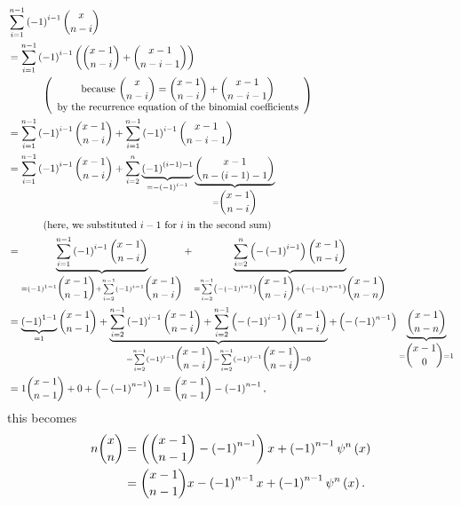 \documentclass[numbers=enddot,12pt,final,onecolumn,notitlepage]{scrartcl}%
\begin{document}
\begin{align*}
&  \sum_{i=1}^{n-1}\left(  -1\right)  ^{i-1}\dbinom{x}{n-i}\\
&  =\sum_{i=1}^{n-1}\left(  -1\right)  ^{i-1}\left(  \dbinom{x-1}{n-i}%
+\dbinom{x-1}{n-i-1}\right) \\
&  \ \ \ \ \ \ \ \ \ \ \left(
\begin{array}
[c]{c}%
\text{because }\dbinom{x}{n-i}=\dbinom{x-1}{n-i}+\dbinom{x-1}{n-i-1}\\
\text{by the recurrence equation of the binomial coefficients}%
\end{array}
\right) \\
&  =\sum_{i=1}^{n-1}\left(  -1\right)  ^{i-1}\dbinom{x-1}{n-i}+\sum
_{i=1}^{n-1}\left(  -1\right)  ^{i-1}\dbinom{x-1}{n-i-1}\\
&  =\sum_{i=1}^{n-1}\left(  -1\right)  ^{i-1}\dbinom{x-1}{n-i}+\sum_{i=2}%
^{n}\underbrace{\left(  -1\right)  ^{\left(  i-1\right)  -1}}_{=-\left(
-1\right)  ^{i-1}}\underbrace{\dbinom{x-1}{n-\left(  i-1\right)  -1}%
}_{=\dbinom{x-1}{n-i}}\\
&  \ \ \ \ \ \ \ \ \ \ \left(  \text{here, we substituted }i-1\text{ for
}i\text{ in the second sum}\right) \\
&  =\underbrace{\sum_{i=1}^{n-1}\left(  -1\right)  ^{i-1}\dbinom{x-1}{n-i}%
}_{=\left(  -1\right)  ^{1-1}\dbinom{x-1}{n-1}+\sum\limits_{i=2}^{n-1}\left(
-1\right)  ^{i-1}\dbinom{x-1}{n-i}}+\underbrace{\sum_{i=2}^{n}\left(  -\left(
-1\right)  ^{i-1}\right)  \dbinom{x-1}{n-i}}_{=\sum\limits_{i=2}^{n-1}\left(
-\left(  -1\right)  ^{i-1}\right)  \dbinom{x-1}{n-i}+\left(  -\left(
-1\right)  ^{n-1}\right)  \dbinom{x-1}{n-n}}\\
&  =\underbrace{\left(  -1\right)  ^{1-1}}_{=1}\dbinom{x-1}{n-1}%
+\underbrace{\sum\limits_{i=2}^{n-1}\left(  -1\right)  ^{i-1}\dbinom{x-1}%
{n-i}+\sum\limits_{i=2}^{n-1}\left(  -\left(  -1\right)  ^{i-1}\right)
\dbinom{x-1}{n-i}}_{=\sum\limits_{i=2}^{n-1}\left(  -1\right)  ^{i-1}%
\dbinom{x-1}{n-i}-\sum\limits_{i=2}^{n-1}\left(  -1\right)  ^{i-1}\dbinom
{x-1}{n-i}=0}+\left(  -\left(  -1\right)  ^{n-1}\right)  \underbrace{\dbinom
{x-1}{n-n}}_{=\dbinom{x-1}{0}=1}\\
&  =1\dbinom{x-1}{n-1}+0+\left(  -\left(  -1\right)  ^{n-1}\right)
1=\dbinom{x-1}{n-1}-\left(  -1\right)  ^{n-1},
\end{align*}
this becomes%
\begin{align*}
n\dbinom{x}{n}  &  =\left(  \dbinom{x-1}{n-1}-\left(  -1\right)
^{n-1}\right)  x+\left(  -1\right)  ^{n-1}\psi^{n}\left(  x\right) \\
&  =\dbinom{x-1}{n-1}x-\left(  -1\right)  ^{n-1}x+\left(  -1\right)
^{n-1}\psi^{n}\left(  x\right)  .
\end{align*}
\end{document}
